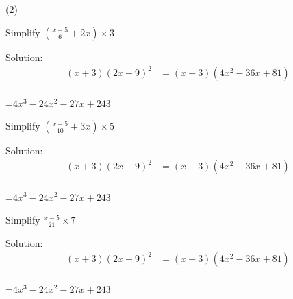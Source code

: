 \begin{mtask}[resume]
\end{mtask}

\clearpage


\clearpage



\begin{mtask}[resume](2)
   \task \begin{exercise} Simplify $\left(\frac{x-5}{6}+2x\right)\times 3$
              \begin{envSolution}
			      Solution:
			      \begin{align*}
			        (x+3)(2x-9)^2  &= (x+3)(4x^2-36x+81)                      \\[10pt]    
				 \end{align*}
                 \begin{shortsolution}  
				       =$4x^3-24x^2-27x+243$
			     \end{shortsolution}				 
               \end{envSolution}
         \end{exercise}

   \task \begin{exercise} Simplify $\left(\frac{x-5}{10}+3x\right)\times 5$
              \begin{envSolution}
			      Solution:
			      \begin{align*}
			        (x+3)(2x-9)^2  &= (x+3)(4x^2-36x+81)                      \\[10pt]    
				 \end{align*}
                 \begin{shortsolution}  
				       =$4x^3-24x^2-27x+243$
			     \end{shortsolution}				 
               \end{envSolution}
         \end{exercise}

   \task \begin{exercise} Simplify $\frac{x-5}{21}\times 7$
              \begin{envSolution}
			      Solution:
			      \begin{align*}
			        (x+3)(2x-9)^2  &= (x+3)(4x^2-36x+81)                      \\[10pt]    
				 \end{align*}
                 \begin{shortsolution}  
				       =$4x^3-24x^2-27x+243$
			     \end{shortsolution}				 
               \end{envSolution}
         \end{exercise}



\end{mtask}
